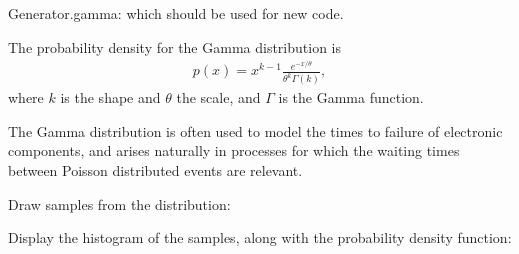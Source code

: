 \documentclass[letterpaper,10pt,english]{sphinxmanual}
\begin{document}
\begin{fulllineitems}
\begin{description}
\end{description}

Generator.gamma: which should be used for new code.

The probability density for the Gamma distribution is
\begin{equation*}
\begin{split}p(x) = x^{k-1}\frac{e^{-x/\theta}}{\theta^k\Gamma(k)},\end{split}
\end{equation*}
where \(k\) is the shape and \(\theta\) the scale,
and \(\Gamma\) is the Gamma function.

The Gamma distribution is often used to model the times to failure of
electronic components, and arises naturally in processes for which the
waiting times between Poisson distributed events are relevant.

Draw samples from the distribution:

\begin{sphinxVerbatim}[commandchars=\\\{\}]
      
    
\end{sphinxVerbatim}

Display the histogram of the samples, along with
the probability density function:


\end{fulllineitems}
\end{document}
